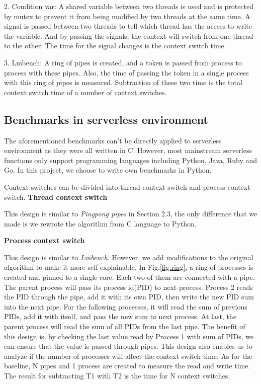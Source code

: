 	2. Condition var\cite{cs-web}: A shared variable between two threads is used and is protected by mutex to prevent it from being modified by two threads at the same time.
		      A signal is passed between two threads to tell which thread has the access to write the variable.
			  And by passing the signals, the context will switch from one thread to the other. 
			  The time for the signal changes is the context switch time.
	
	3.  Lmbench\cite{cs-lmbench}: A ring of pipes is created, and a token is passed from process to process with these pipes. 
	          Also, the time of passing the token in a single process with this ring of pipes is measured. 
			  Subtraction of these two time is the total context switch time of a number of context switches.

\subsection{Benchmarks in serverless environment}
	The aforementioned benchmarks can't be directly applied to serverless environment as they were all written in C.
	However, most mainstream serverless functions only support programming languages including Python, Java, Ruby and Go.
	In this project, we choose to write own benchmarks in Python.

	Context switches can be divided into thread context switch and process context switch. 
	\textbf{Thread context switch}

	This design is similar to \emph{Pingpong pipes}\cite*{cs-pipes,cs-web} in Section 2.3, 
	the only difference that we made is we rewrote the algorithm from C language to Python.

	\textbf{Process context switch}

	This design is similar to \emph{Lmbench}\cite{cs-lmbench}. 
	However, we add modifications to the original algorithm to make it more self-explainable.
	In Fig.\ref{fig:ring}, a ring of processes is created and pinned to a single core. 
	Each two of them are connected with a pipe. 
	The parent process will pass its process id(PID) to next process. 
	Process 2 reads the PID through the pipe, add it with its own PID, then write the new PID sum into the next pipe. 
	For the following processes, it will read the sum of previous PIDs, add it with itself, and pass the new sum to next process. 
	At last, the parent process will read the sum of all PIDs from the last pipe. 
	The benefit of this design is, by checking the last value read by Process 1 with sum of PIDs, we can ensure that the value is passed through pipes. 
	This design also enables us to analyze if the number of processes will affect the context switch time.
	As for the baseline, N pipes and 1 process are created to measure the read and write time. 
	The result for subtracting T1 with T2 is the time for N context switches.
	
